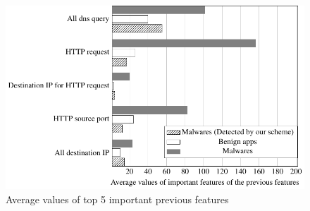 \begin{figure}[p]
	\includegraphics[scale=1.0, bb=10 10 250 250]{./figures/important_prev_f_tikz.pdf}
  \caption{Average values of top 5 important previous features} 
  \label{fig:important_prev_feature}
\end{figure}


\afterpage{\clearpage}
\newpage


